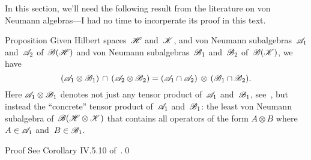 \documentclass[a]{subfiles}
\begin{document}
\begin{parsec}%
\begin{point}%
In this section,
we'll need the following result
from the literature on von Neumann algebras---I 
had no time to incorperate its proof in this text.
\end{point}
\begin{point}{Proposition}%
Given Hilbert spaces~$\mathscr{H}$ and~$\mathscr{K}$,
and von Neumann subalgebras~$\mathscr{A}_1$ and~$\mathscr{A}_2$
of~$\mathscr{B}(\mathscr{H})$
and von Neumann subalgebras~$\mathscr{B}_1$ and~$\mathscr{B}_2$
of~$\mathscr{B}(\mathscr{K})$,
we have 
\begin{equation*}
(\mathscr{A}_1 \otimes  \mathscr{B}_1)\,\cap\,
(\mathscr{A}_2 \otimes \mathscr{B}_2)
= (\mathscr{A}_1\cap\mathscr{A}_2)\,\otimes\,
(\mathscr{B}_1\cap \mathscr{B}_2).
\end{equation*}
Here
$\mathscr{A}_1 \otimes \mathscr{B}_1$
denotes not just any tensor product of~$\mathscr{A}_1$ and~$\mathscr{B}_1$,
see~,
but instead
the ``concrete'' tensor product 
of~$\mathscr{A}_1$ and~$\mathscr{B}_1$:
the least von Neumann subalgebra of~$\mathscr{B}(\mathscr{H}\otimes\mathscr{K})$
that contains all operators
of the form $A\otimes B$ where~$A\in\mathscr{A}_1$
and~$B\in\mathscr{B}_1$.
\begin{point}{Proof}%
See Corollary IV.5.10 of~\cite{Takesaki1}.\qed
\end{point}
\end{point}
\end{parsec}
\end{document}
